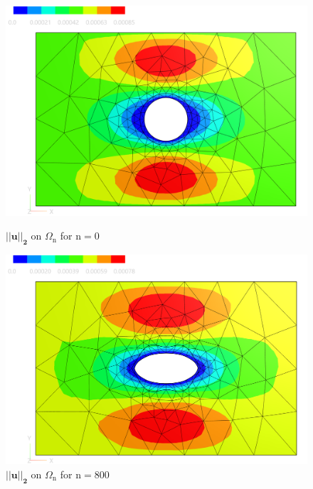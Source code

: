 \begin{figure}
\begin{minipage}{.5\textwidth}
    \centering
    \includegraphics[width=1\textwidth]{figures/u_0.PNG}
    \caption{ $\mathbf{||u||_2}$ on $\Omega_{\mathrm{n}}$ for $\mathrm{n}=0$}
    \label{plot_ref_u_0}
\end{minipage}
\begin{minipage}{.5\textwidth}
    \centering
    \includegraphics[width=1\textwidth]{figures/u_final.PNG}
    \caption{ $\mathbf{||u||_2}$ on $\Omega_{\mathrm{n}}$ for $\mathrm{n}=800$}
    \label{plot_ref_u_final}
\end{minipage}
\end{figure}

